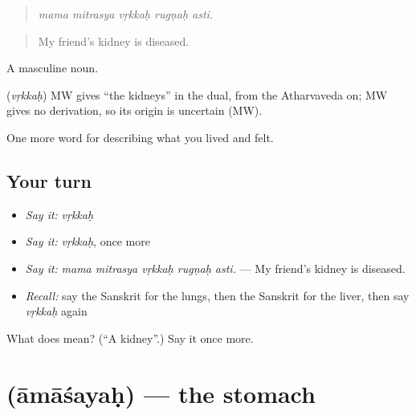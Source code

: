 \begin{quote}
    
\end{quote}

\begin{quote}
\emph{mama mitrasya vṛkkaḥ rugṇaḥ asti.}
\end{quote}

\begin{quote}
My friend's kidney is diseased.
\end{quote}

A masculine noun.

\begin{cousinweb}
\textbf{} (\emph{vṛkkaḥ}) MW gives \textquotedblleft{}the kidneys\textquotedblright{} in the dual, from the Atharvaveda on; MW gives no derivation, so its origin is uncertain (MW).
\end{cousinweb}

\begin{grammarlens}[title={What you've built}]
One more word for describing what you lived and felt.
\end{grammarlens}

\subsection*{Your turn}
\begin{itemize}
\raggedright
  \item \emph{Say it:} \emph{vṛkkaḥ}
  \item \emph{Say it:} \emph{vṛkkaḥ}, once more
  \item \emph{Say it:} \emph{mama mitrasya vṛkkaḥ rugṇaḥ asti.} — My friend's kidney is diseased.
  \item \emph{Recall:} say the Sanskrit for the lungs, then the Sanskrit for the liver, then say \emph{vṛkkaḥ} again
\end{itemize}

\begin{tcolorbox}[breakable,colback=teal!4,colframe=teal!35!black,title={Before you move on}]
What does  mean? (\textquotedblleft{}A kidney\textquotedblright{}.) Say it once more.
\end{tcolorbox}
\section[\texorpdfstring{\sk{आमाशयः} (āmāśayaḥ)}{आमाशयः (āmāśayaḥ)}]{ (āmāśayaḥ) — the stomach}

